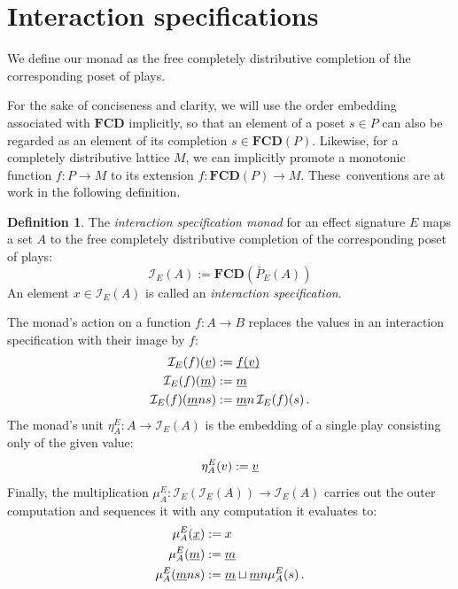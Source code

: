 \documentclass[11pt,oneside,draft]{book}
\theoremstyle{definition}
\newtheorem{definition}[theorem]{Definition}
\newcommand{\ul}[1]{%
  \underline{\smash{#1}}
}
\begin{document}
%
%


\section{Interaction specifications} %

We define our monad as the free completely distributive completion
of the corresponding poset of plays.

For the sake of conciseness and clarity,
we will use the order embedding associated with $\mathbf{FCD}$
implicitly,
so that an element of a poset $s \in P$
can also be regarded as an element of
its completion $s \in \mathbf{FCD}(P)$.
Likewise,
for a completely distributive lattice $M$,
we can implicitly
promote a monotonic function
$f : P \rightarrow M$
to its extension
$f : \mathbf{FCD}(P) \rightarrow M$.
These~conventions are at work
in the following definition.

\begin{definition} \label{def:intm} %
The \emph{interaction specification monad}
for an effect signature $E$
maps a set $A$
to the free completely distributive completion
of the corresponding poset of plays:
\[
    \mathcal{I}_E(A) :=
      \mathbf{FCD}(\bar{P}_E(A))
\]
An element $x \in \mathcal{I}_E(A)$ is called
an \emph{interaction specification}.

The monad's action on a function $f : A \rightarrow B$
replaces the values in
an interaction specification with their image by $f$:
\begin{align*}
  \mathcal{I}_E(f)(\ul{v}) &:= \ul{f(v)} \\
  \mathcal{I}_E(f)(\ul{m}) &:= \ul{m} \\
  \mathcal{I}_E(f)(\ul{m} n s) &:=
    \ul{m} n \, \mathcal{I}_E(f)(s) \,.
\end{align*}
The monad's unit
$\eta^E_A : A \rightarrow \mathcal{I}_E(A)$
is the embedding of a single play
consisting only of the given value:
\[
    \eta^E_A(v) := \ul{v}
\]
Finally, the multiplication
$\mu^E_A : \mathcal{I}_E(\mathcal{I}_E(A)) \rightarrow \mathcal{I}_E(A)$
carries out the outer computation and
sequences it with any computation it evaluates to:
\begin{align*}
  \mu^E_A(\ul{x}) &:= x \\
  \mu^E_A(\ul{m}) &:= \ul{m} \\
  \mu^E_A(\ul{m} n s) &:=
    \ul{m} \sqcup \ul{m} n \mu^E_A(s) \,.
\end{align*}
\end{definition}
\end{document}
